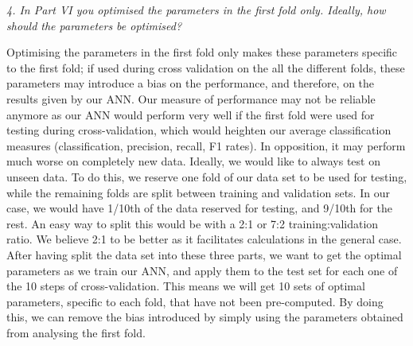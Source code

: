 \documentclass[a4wide, 11pt]{article}
\begin{document}
\textit{4. In Part VI you optimised the parameters in the first fold only. Ideally, how should the parameters be optimised?}

Optimising the parameters in the first fold only makes these parameters specific to the first fold; if used during cross validation on the all the different folds, these parameters may introduce a bias on the performance, and therefore, on the results given by our ANN. Our measure of performance may not be reliable anymore as our ANN would perform very well if the first fold were used for testing during cross-validation, which would heighten our average classification measures (classification, precision, recall, F1 rates). In opposition, it may perform much worse on completely new data. Ideally, we would like to always test on unseen data. To do this, we reserve one fold of our data set to be used for testing, while the remaining folds are split between training and validation sets. In our case, we would have 1/10th of the data reserved for testing, and 9/10th for the rest. An easy way to split this would be with a 2:1 or 7:2 training:validation ratio. We believe 2:1 to be better as it facilitates calculations in the general case. After having split the data set into these three parts, we want to get the optimal parameters as we train our ANN, and apply them to the test set for each one of the 10 steps of cross-validation. This means we will get 10 sets of optimal parameters, specific to each fold, that have not been pre-computed. By doing this, we can remove the bias introduced by simply using the parameters obtained from analysing the first fold.
\end{document}
